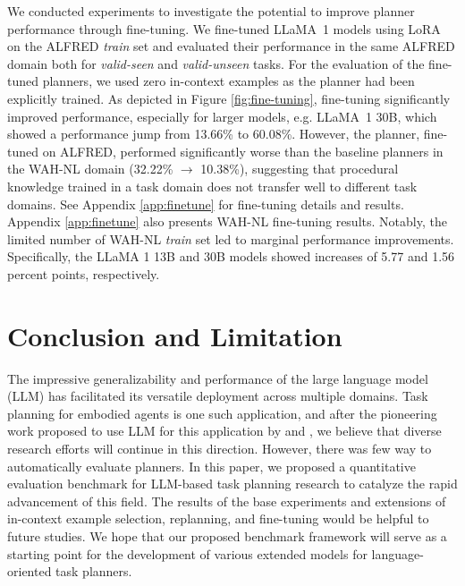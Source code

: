 We conducted experiments to investigate the potential to improve planner performance through fine-tuning. We fine-tuned LLaMA~1 models using LoRA \citep{hu2021lora} on the ALFRED \textit{train} set and evaluated their performance in the same ALFRED domain both for \textit{valid-seen} and \textit{valid-unseen} tasks. 
For the evaluation of the fine-tuned planners, we used zero in-context examples as the planner had been explicitly trained.
As depicted in Figure \ref{fig:fine-tuning}, fine-tuning significantly improved performance, especially for larger models, e.g. LLaMA~1 30B, which showed a performance jump from 13.66\% to 60.08\%. However, the planner, fine-tuned on ALFRED, performed significantly worse than the baseline planners in the WAH-NL domain (32.22\% $\rightarrow$ 10.38\%), suggesting that procedural knowledge trained in a task domain does not transfer well to different task domains. See Appendix \ref{app:finetune} for fine-tuning details and results. Appendix \ref{app:finetune} also presents WAH-NL fine-tuning results. Notably, the limited number of WAH-NL \textit{train} set led to marginal performance improvements. Specifically, the LLaMA 1 13B and 30B models showed increases of 5.77 and 1.56 percent points, respectively.

\section{Conclusion and Limitation}
\label{sec:conclusion}

The impressive generalizability and performance of the large language model (LLM) has facilitated its versatile deployment across multiple domains. Task planning for embodied agents is one such application, and after the pioneering work proposed to use LLM for this application by \citet{ahn2023do} and \citet{huang2022language}, we believe that diverse research efforts will continue in this direction. However, there was few way to automatically evaluate planners. In this paper, we proposed a quantitative evaluation benchmark for LLM-based task planning research to catalyze the rapid advancement of this field. The results of the base experiments and extensions of in-context example selection, replanning, and fine-tuning would be helpful to future studies. We hope that our proposed benchmark framework will serve as a starting point for the development of various extended models for language-oriented task planners.

